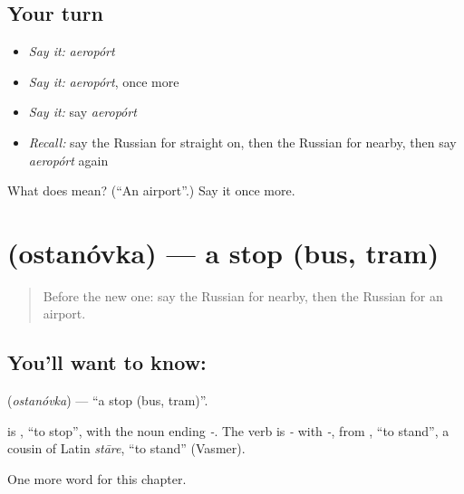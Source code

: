 \subsection*{Your turn}
\begin{itemize}
\raggedright
  \item \emph{Say it:} \emph{aeropórt}
  \item \emph{Say it:} \emph{aeropórt}, once more
  \item \emph{Say it:} say \emph{aeropórt}
  \item \emph{Recall:} say the Russian for straight on, then the Russian for nearby, then say \emph{aeropórt} again
\end{itemize}

\begin{tcolorbox}[breakable,colback=teal!4,colframe=teal!35!black,title={Before you move on}]
What does  mean? (\textquotedblleft{}An airport\textquotedblright{}.) Say it once more.
\end{tcolorbox}
\section[\texorpdfstring{\ru{остановка} (ostanóvka)}{остановка (ostanóvka)}]{ (ostanóvka) — a stop (bus, tram)}

\label{lesson:RU-C87-stop}



\begin{quote}
Before the new one: say the Russian for nearby, then the Russian for an airport.
\end{quote}

\subsection*{You'll want to know: }
\textbf{} (\emph{ostanóvka}) — \textquotedblleft{}a stop (bus, tram)\textquotedblright{}.

\begin{cousinweb}
\textbf{} is \emph{}, \textquotedblleft{}to stop\textquotedblright{}, with the noun ending \emph{-}. The verb is \emph{-} with \emph{-}, from \emph{}, \textquotedblleft{}to stand\textquotedblright{}, a cousin of Latin \emph{stāre}, \textquotedblleft{}to stand\textquotedblright{} (Vasmer).
\end{cousinweb}

\begin{grammarlens}[title={What you've built}]
One more word for this chapter.
\end{grammarlens}

